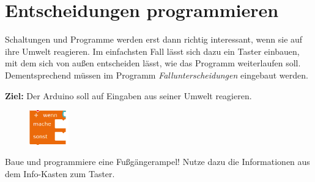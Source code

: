 \newpage
\nopagecolor
\section{Entscheidungen programmieren}
\label{sec:entscheidungen}

Schaltungen und Programme werden erst dann richtig interessant, wenn sie auf ihre Umwelt reagieren. Im einfachsten Fall lässt sich dazu ein Taster einbauen, mit dem sich von außen entscheiden lässt, wie das Programm weiterlaufen soll. Dementsprechend müssen im Programm \emph{Fallunterscheidungen} eingebaut werden.

\begin{ziel}
	\textbf{Ziel:} Der Arduino soll auf Eingaben aus seiner Umwelt reagieren.
\end{ziel}

\bigskip
\begin{projekt}[Fußgängerampel]\label{proj:fussampel}
	\begin{figure}
		\centering
		\vspace{-2\baselineskip}
		\includegraphics[width=0.15\textwidth]{./pics/wenn-mache-sonst.png}
		\label{abb:falls-dann}
	\end{figure}
	Baue und programmiere eine Fußgängerampel! Nutze dazu die Informationen aus dem Info-Kasten zum Taster.
\end{projekt}

